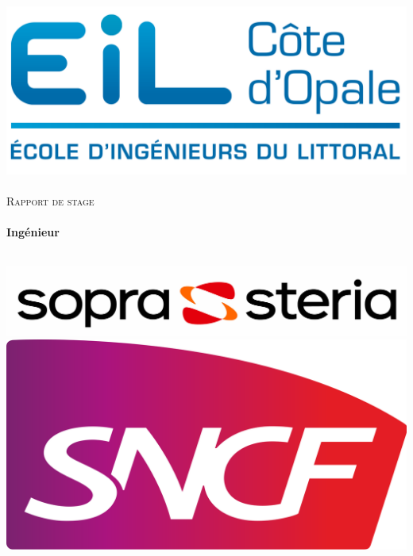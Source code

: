 \begin{titlepage}
  \begin{sffamily}
  \begin{center}

    \includegraphics[scale=0.5]{img/eilco.png}~\\[1.5cm]


    \textsc{\Large Rapport de stage}\\[1.5cm]

    \HRule \\[0.4cm]
    { \huge \bfseries Ingénieur\\[0.4cm] }

    \HRule \\[2cm]
    \includegraphics[scale=0.7]{img/soprasteria.jpg}
    \\[1cm]
\includegraphics[scale=0.1]{img/sncf.png} \\[2cm]
~\\


\end{center}
\end{sffamily}
\end{titlepage}

